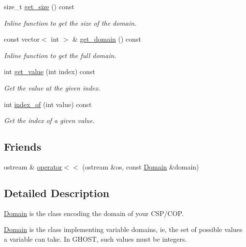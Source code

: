 \begin{DoxyCompactItemize}
size\+\_\+t \hyperlink{classghost_1_1Domain_a222990a926a5313aef33025d48b41712}{get\+\_\+size} () const 
\begin{DoxyCompactList}\small\item\em Inline function to get the size of the domain. \end{DoxyCompactList}\item 
const vector$<$ int $>$ \& \hyperlink{classghost_1_1Domain_af14587da3669db692a9b988cc240999a}{get\+\_\+domain} () const 
\begin{DoxyCompactList}\small\item\em Inline function to get the full domain. \end{DoxyCompactList}\item 
int \hyperlink{classghost_1_1Domain_a6e50fc11a5ed2857fccb69f12c0fa07d}{get\+\_\+value} (int index) const 
\begin{DoxyCompactList}\small\item\em Get the value at the given index. \end{DoxyCompactList}\item 
int \hyperlink{classghost_1_1Domain_a1201d3b7c15381d19510a131d8823ff0}{index\+\_\+of} (int value) const 
\begin{DoxyCompactList}\small\item\em Get the index of a given value. \end{DoxyCompactList}\end{DoxyCompactItemize}
\subsection*{Friends}
\begin{DoxyCompactItemize}
\item 
ostream \& \hyperlink{classghost_1_1Domain_a608c9910828eb2983efb65ff4c297a4e}{operator$<$$<$} (ostream \&os, const \hyperlink{classghost_1_1Domain}{Domain} \&domain)
\end{DoxyCompactItemize}


\subsection{Detailed Description}
\hyperlink{classghost_1_1Domain}{Domain} is the class encoding the domain of your C\+S\+P/\+C\+OP. 

\hyperlink{classghost_1_1Domain}{Domain} is the class implementing variable domains, ie, the set of possible values a variable can take. In G\+H\+O\+ST, such values must be integers. 

